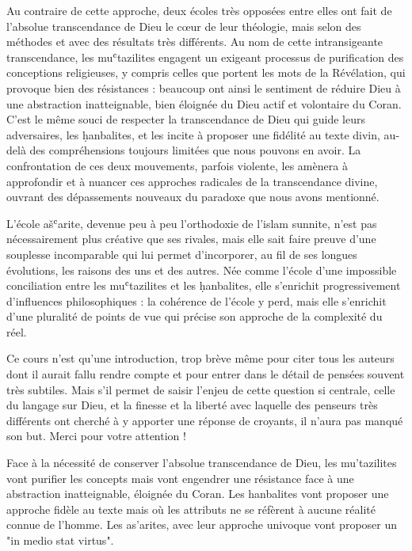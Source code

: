 Au contraire de cette approche, deux écoles très opposées entre elles
ont fait de l'absolue transcendance de Dieu le cœur de leur théologie,
mais selon des méthodes et avec des résultats très différents. Au nom de
cette intransigeante transcendance, les muʿtazilites engagent un
exigeant processus de purification des conceptions religieuses, y
compris celles que portent les mots de la Révélation, qui provoque bien
des résistances : beaucoup ont ainsi
le sentiment de réduire Dieu à une abstraction inatteignable, bien
éloignée du Dieu actif et volontaire du Coran. C'est le même souci de
respecter la transcendance de Dieu qui guide leurs adversaires, les
ḥanbalites, et les incite à proposer une fidélité au texte divin,
au-delà des compréhensions toujours limitées que nous pouvons en avoir.
La confrontation de ces deux mouvements, parfois violente, les amènera à
approfondir et à nuancer ces approches radicales de la transcendance
divine, ouvrant des dépassements nouveaux du paradoxe que nous avons
mentionné.

L'école ašʿarite, devenue peu à peu l'orthodoxie de l'islam sunnite,
n'est pas nécessairement plus créative que ses rivales, mais elle sait
faire preuve d'une souplesse incomparable qui lui permet d'incorporer,
au fil de ses longues évolutions, les raisons des uns et des autres. Née
comme l'école d'une impossible conciliation entre les muʿtazilites et
les ḥanbalites, elle s'enrichit progressivement d'influences
philosophiques : la cohérence de l'école y perd, mais elle s'enrichit
d'une pluralité de points de vue qui précise son approche de la
complexité du réel.

Ce cours n'est qu'une introduction, trop brève même pour citer tous les
auteurs dont il aurait fallu rendre compte et pour entrer dans le détail
de pensées souvent très subtiles. Mais s'il permet de saisir l'enjeu de
cette question si centrale, celle du langage sur Dieu, et la finesse et
la liberté avec laquelle des penseurs très différents ont cherché à y
apporter une réponse de croyants, il n'aura pas manqué son but. Merci
pour votre attention !

\begin{Synthesis}
Face à la nécessité de conserver l'absolue transcendance de Dieu, les mu'tazilites vont purifier les concepts mais vont engendrer une résistance face à une abstraction inatteignable, éloignée du Coran. Les hanbalites vont proposer une approche fidèle au texte mais où les attributs ne se réfèrent à aucune réalité connue de l'homme.
Les as'arites, avec leur approche univoque vont proposer un "in medio stat virtus".
\end{Synthesis}